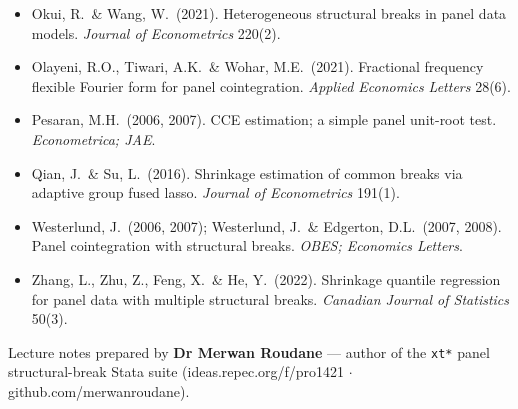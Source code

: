 \documentclass[11pt,a4paper]{article}
\theoremstyle{definition}
\begin{document}
\begin{itemize}[leftmargin=1.2em,itemsep=1pt]
 error structures. \emph{Journal of Econometrics} 160(2).
 \item Okui, R.\ \& Wang, W.\ (2021). Heterogeneous structural breaks in panel data models.
 \emph{Journal of Econometrics} 220(2).
 \item Olayeni, R.O., Tiwari, A.K.\ \& Wohar, M.E.\ (2021). Fractional frequency flexible Fourier form
 for panel cointegration. \emph{Applied Economics Letters} 28(6).
 \item Pesaran, M.H.\ (2006, 2007). CCE estimation; a simple panel unit-root test.
 \emph{Econometrica; JAE}.
 \item Qian, J.\ \& Su, L.\ (2016). Shrinkage estimation of common breaks via adaptive group fused
 lasso. \emph{Journal of Econometrics} 191(1).
 \item Westerlund, J.\ (2006, 2007); Westerlund, J.\ \& Edgerton, D.L.\ (2007, 2008). Panel
 cointegration with structural breaks. \emph{OBES; Economics Letters}.
 \item Zhang, L., Zhu, Z., Feng, X.\ \& He, Y.\ (2022). Shrinkage quantile regression for panel data
 with multiple structural breaks. \emph{Canadian Journal of Statistics} 50(3).
\end{itemize}

\vfill
\begin{center}\small\color{cgray}
Lecture notes prepared by \textbf{\color{cgrape}Dr Merwan Roudane} --- author of the \texttt{xt*}
panel structural-break Stata suite (ideas.repec.org/f/pro1421 $\cdot$ github.com/merwanroudane).
\end{center}
\end{document}
